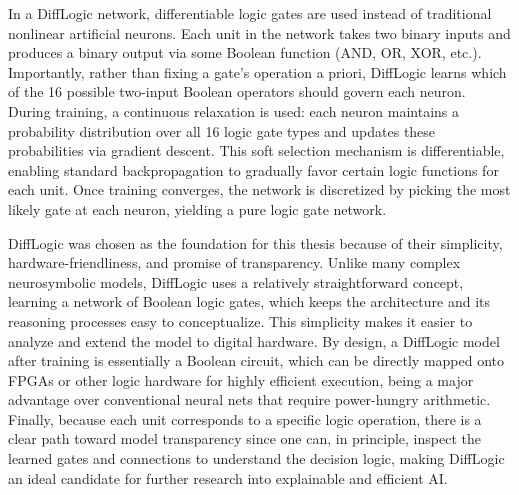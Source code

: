 In a DiffLogic network, differentiable logic gates are used instead of traditional nonlinear artificial neurons. Each unit in the network takes two binary inputs and produces a binary output via some Boolean function (AND, OR, XOR, etc.). Importantly, rather than fixing a gate’s operation a priori, DiffLogic learns which of the 16 possible two-input Boolean operators should govern each neuron. During training, a continuous relaxation is used: each neuron maintains a probability distribution over all 16 logic gate types and updates these probabilities via gradient descent. This soft selection mechanism is differentiable, enabling standard backpropagation to gradually favor certain logic functions for each unit. Once training converges, the network is discretized by picking the most likely gate at each neuron, yielding a pure logic gate network. 

DiffLogic was chosen as the foundation for this thesis because of their simplicity, hardware-friendliness, and promise of transparency. Unlike many complex neurosymbolic models, DiffLogic uses a relatively straightforward concept, learning a network of Boolean logic gates, which keeps the architecture and its reasoning processes easy to conceptualize. This simplicity makes it easier to analyze and extend the model to digital hardware. By design, a DiffLogic model after training is essentially a Boolean circuit, which can be directly mapped onto FPGAs or other logic hardware for highly efficient execution, being a major advantage over conventional neural nets that require power-hungry arithmetic. Finally, because each unit corresponds to a specific logic operation, there is a clear path toward model transparency since one can, in principle, inspect the learned gates and connections to understand the decision logic, making DiffLogic an ideal candidate for further research into explainable and efficient AI.




